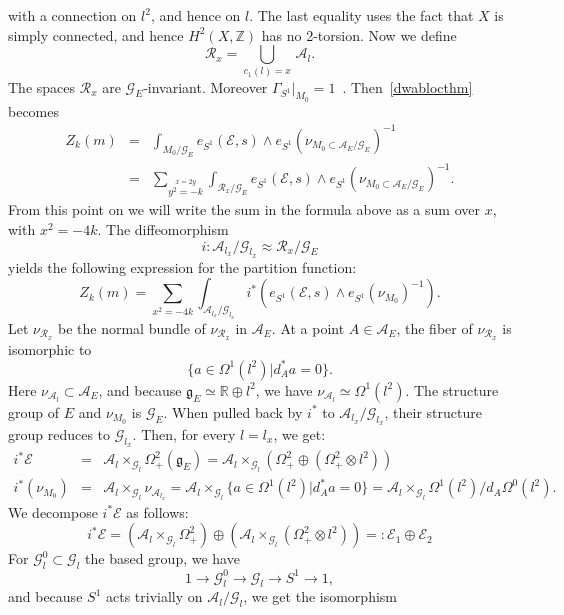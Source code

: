 \documentclass[a4paper,12pt,reqno,sumlimits]{amsart}
\theoremstyle{plain}
\theoremstyle{definition}
\newcommand{\R}{{\mathbb R}}
\newcommand{\Z}{{\mathbb Z}}
\newcommand{\1}{{\bf 1}}
\newcommand{\g}{{\mathfrak  g}}
\newcommand{\calA}{{\mathcal A}}
\newcommand{\calE}{{\mathcal E}}
\newcommand{\calG}{{\mathcal G}}
\newcommand{\calR}{{\mathcal R}}
\renewcommand{\to}{\longrightarrow}
\newcommand{\inv}{^{-1}}
\numberwithin{equation}{section}
\begin{document}
with a connection on $l^2$, and hence on $l$.  The last equality uses the
fact that $X$ is simply connected, and hence $H^2(X,\Z)$ has no 2-torsion.
Now we define
$$
\calR_x=\bigcup_{c_1(l)=x}\,\calA_l.
$$
The spaces $\calR_x$ are $\calG_E$-invariant. 
Moreover $\Gamma_{S^1}\big|_{M_0}=1$~\cite[p. 67]{radu}.
Then~\eqref{dwablocthm} becomes
\begin{eqnarray*}
  Z_k(m)&=&\int_{M_0/\calG_E}
  e_{S^1}(\calE,s)\wedge 
  e_{S^1}(\nu_{M_0\subset\calA_E/\calG_E})\inv\\
  &=&\sum_{\stackrel{x=2y}{y^2=-k}}
  \int_{\calR_x/\calG_E} e_{S^1}(\calE,s)\wedge
  e_{S^1}(\nu_{M_0\subset\calA_E/\calG_E})\inv.
\end{eqnarray*}
From this point on we will write the sum in the formula above as a sum over
$x$, with $x^2=-4k$.  The diffeomorphism
$$
i:\calA_{l_x}/\calG_{l_x}\approx\calR_x/\calG_E
$$
yields the following expression for the partition function:
\begin{equation}
  \label{dwabloc1}
  Z_k(m)=\sum_{x^2=-4k}
  \int_{\calA_{l_x}/\calG_{l_x}}
  i^*\left(e_{S^1}(\calE,s)\wedge
    e_{S^1}(\nu_{M_0})\inv\right).
\end{equation}
Let $\nu_{\calR_x}$ be the normal bundle of $\nu_{\calR_x}$ in $\calA_E$. At
a point $A\in\calA_E$, the fiber of $\nu_{\calR_x}$ is isomorphic to
$$
\{a\in\Omega^1(l^2)|d_A^*a=0\}.
$$
Here $\nu_{\calA_l}\subset\calA_E$, and because $\g_E\simeq\R\oplus
l^2$, we have $\nu_{\calA_l}\simeq\Omega^1(l^2).$ The structure group of $E$
and $\nu_{M_0}$ is $\calG_E$. When pulled back by $i^*$ to
$\calA_{l_x}/\calG_{l_x}$, their structure group reduces to $\calG_{l_x}$.
Then, for every $l=l_x$, we get:
\begin{eqnarray*}
  i^*\calE&=&\calA_l\times_{\calG_l}\Omega^2_+(\g_E)=
  \calA_l\times_{\calG_l}\left(\Omega^2_+\oplus
    (\Omega^2_+\otimes l^2)\right)\\ 
  i^*(\nu_{M_0})&=& \calA_l\times_{\calG_l}\nu_{\calA_{l_x}}=
  \calA_l\times_{\calG_l}\{a\in\Omega^1(l^2) | d_A^*a=0\}
  =\calA_l\times_{\calG_l}\Omega^1(l^2)/d_A\Omega^0(l^2).
\end{eqnarray*}
We decompose $i^*\calE$ as follows:
\begin{equation*}
  i^*\calE=\left(\calA_l\times_{\calG_l}\Omega^2_+\right)\oplus
  \left(\calA_l\times_{\calG_l}(\Omega^2_+\otimes l^2)\right)
  =:\calE_1\oplus\calE_2
\end{equation*}
For $\calG_l^0\subset\calG_l$ the based group, we have
$$
1\to\calG_l^0\to\calG_l\to S^1\to 1,
$$
and because $S^1$ acts trivially on $\calA_l/\calG_l$, we get the isomorphism
\end{document}
